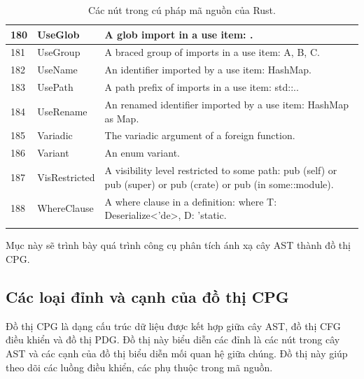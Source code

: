 \begin{longtable}{| p{} | p{} | p{} |}
180   & UseGlob                        & A glob import in a use item: \*.                                                                               \\ \hline
181   & UseGroup                       & A braced group of imports in a use item: {A, B, C}.                                                            \\ \hline
182   & UseName                        & An identifier imported by a use item: HashMap.                                                                 \\ \hline
183   & UsePath                        & A path prefix of imports in a use item: std::..                                                                \\ \hline
184   & UseRename                      & An renamed identifier imported by a use item: HashMap as Map.                                                  \\ \hline
185   & Variadic                       & The variadic argument of a foreign function.                                                                   \\ \hline
186   & Variant                        & An enum variant.                                                                                               \\ \hline
187   & VisRestricted                  & A visibility level restricted to some path: pub (self) or pub (super) or pub (crate) or pub (in some::module). \\ \hline
188   & WhereClause                    & A where clause in a definition: where T: Deserialize<'de>, D: 'static.                                         \\ \hline
\caption{Các nút trong cú pháp mã nguồn của Rust.}
\label{table:c3s_nodeastrust}
\end{longtable}
\medskip

Mục này sẽ trình bày quá trình công cụ phân tích ánh xạ cây AST
thành đồ thị CPG.

\subsection{Các loại đỉnh và cạnh của đồ thị CPG}

Đồ thị CPG là dạng cấu trúc dữ liệu được kết hợp giữa cây AST, đồ thị CFG điều khiển và đồ thị PDG.
Đồ thị này biểu diễn các đỉnh là các nút trong cây AST và các cạnh của đồ thị biểu diễn mối quan hệ giữa chúng.
Đồ thị này giúp theo dõi các luồng điều khiển, các phụ thuộc trong mã nguồn.

